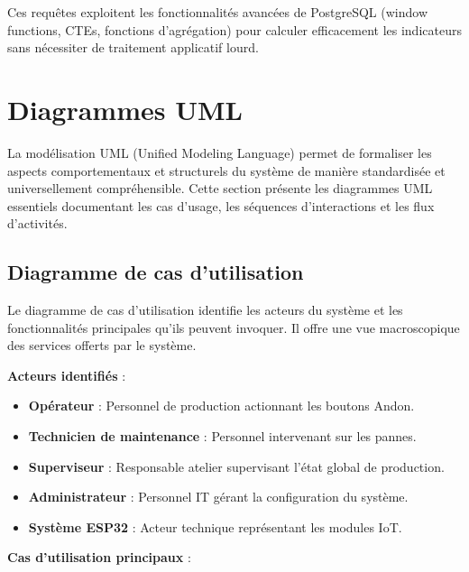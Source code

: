 Ces requêtes exploitent les fonctionnalités avancées de PostgreSQL (window functions, CTEs, fonctions d'agrégation) pour calculer efficacement les indicateurs sans nécessiter de traitement applicatif lourd.

\section{Diagrammes UML}

La modélisation UML (Unified Modeling Language) permet de formaliser les aspects comportementaux et structurels du système de manière standardisée et universellement compréhensible. Cette section présente les diagrammes UML essentiels documentant les cas d'usage, les séquences d'interactions et les flux d'activités.

\subsection{Diagramme de cas d'utilisation}

Le diagramme de cas d'utilisation identifie les acteurs du système et les fonctionnalités principales qu'ils peuvent invoquer. Il offre une vue macroscopique des services offerts par le système.

\textbf{Acteurs identifiés} :

\begin{itemize}
    \item \textbf{Opérateur} : Personnel de production actionnant les boutons Andon.
    \item \textbf{Technicien de maintenance} : Personnel intervenant sur les pannes.
    \item \textbf{Superviseur} : Responsable atelier supervisant l'état global de production.
    \item \textbf{Administrateur} : Personnel IT gérant la configuration du système.
    \item \textbf{Système ESP32} : Acteur technique représentant les modules IoT.
\end{itemize}


\textbf{Cas d'utilisation principaux} :

